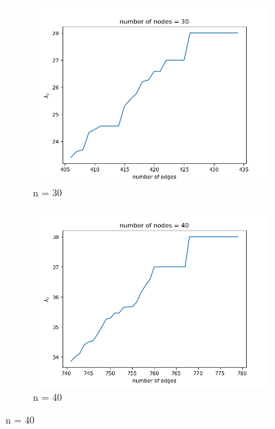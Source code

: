 \documentclass{article}
\begin{document}
\begin{problem}
\begin{figure}[!ht]
    \begin{subfigure}{0.35\textwidth}
        \includegraphics[width=\textwidth]{./img/p5_node30.png}
        \caption{n = 30}
    \end{subfigure}
    \begin{subfigure}{0.35\textwidth}
        \includegraphics[width=\textwidth]{./img/p5_node40.png}
        \caption{n = 40 }
    \end{subfigure}
    

\end{figure}
\end{problem}
\end{document}
